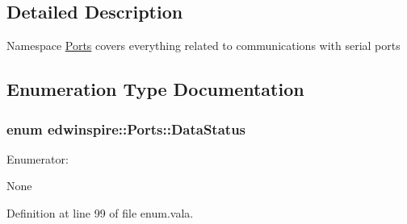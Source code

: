 \subsection{Detailed Description}
Namespace \hyperlink{namespaceedwinspire_1_1_ports}{Ports} covers everything related to communications with serial ports 

\subsection{Enumeration Type Documentation}
\hypertarget{namespaceedwinspire_1_1_ports_a8f46ab15ec2741c3e028c5c5ddff36d3}{
\subsubsection[{Data\-Status}]{\setlength{\rightskip}{0pt plus 5cm}enum {\bf edwinspire\-::\-Ports\-::\-Data\-Status}}}\label{namespaceedwinspire_1_1_ports_a8f46ab15ec2741c3e028c5c5ddff36d3}
\begin{Desc}
\item[Enumerator\-: ]\par
\begin{description}
\item[{\em 
\hypertarget{namespaceedwinspire_1_1_ports_a8f46ab15ec2741c3e028c5c5ddff36d3ab81c145f75c6ff159a38f7dc7fa76aed}{None}\label{namespaceedwinspire_1_1_ports_a8f46ab15ec2741c3e028c5c5ddff36d3ab81c145f75c6ff159a38f7dc7fa76aed}
}]None \end{description}
\end{Desc}



Definition at line 99 of file enum.\-vala.


